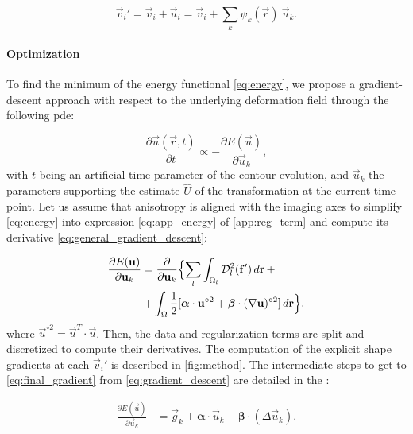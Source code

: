   \begin{equation}
  \vec{v}_i' = \vec{v}_i + \vec{u}_i = \vec{v}_i + \sum_k \psi_k(\vec{r}) \: \vec{u}_k.
  \label{eq:nodes_tfm}
  \end{equation}


\paragraph*{Optimization}
\label{sec:gradient_descent}
To find the minimum of the energy functional \eqref{eq:energy},
  we propose a gradient-descent approach with respect to the underlying
  deformation field through the following \gls*{pde}:

  \begin{equation}
  \frac{\partial \vec{u}(\vec{r},t)}{\partial t} \propto - \frac{\partial E(\vec{u})}{\partial \vec{u}_k},
  \label{eq:general_gradient_descent}
  \end{equation}
%
  with $t$ being an artificial time parameter of the contour
  evolution, and $\vec{u}_k$ the parameters supporting the estimate
  $\hat{U}$ of the transformation at the current time point.
Let us assume that anisotropy is aligned with the imaging axes to simplify
  \eqref{eq:energy} into expression \eqref{eq:app_energy} of \ref{app:reg_term}
  and compute its derivative \eqref{eq:general_gradient_descent}:

  \begin{align}
  \frac{\partial E(\vec{u})}{\partial \vec{u}_k} &=
  \frac{ \partial }{\partial \vec{u}_k} \Big\{
  \underset{l}{\sum} \int_{\Omega_l} \mdist{f'}{l} \,d\vec{r} \, + \notag\\
  &+ \int_{\Omega} \frac12 [ \boldsymbol{\alpha} \cdot \vec{u}^{\circ2}
  + \boldsymbol{\beta} \cdot (\nabla \vec{u})^{\circ2} ] \,d\vec{r}
  \Big\}.
  \label{eq:gradient_descent}
  \end{align}
%
  where $\vec{u}^{\circ2} = \vec{u}^T \cdot \vec{u}$.
Then, the data and regularization terms are split and discretized to compute their
  derivatives.
The computation of the explicit shape gradients at each $\vec{v}_i'$ is described in \autoref{fig:method}.
The intermediate steps to get to \eqref{eq:final_gradient} from \eqref{eq:gradient_descent} are
  detailed in the :

  \begin{align}
  \frac{\partial E(\vec{u})}{\partial \vec{u}_k} &=
  \vec{g}_k  + \boldsymbol{\alpha} \cdot \vec{u}_k - \boldsymbol{\beta} \cdot (\Delta \vec{u}_k).
  \label{eq:final_gradient}
  \end{align}

